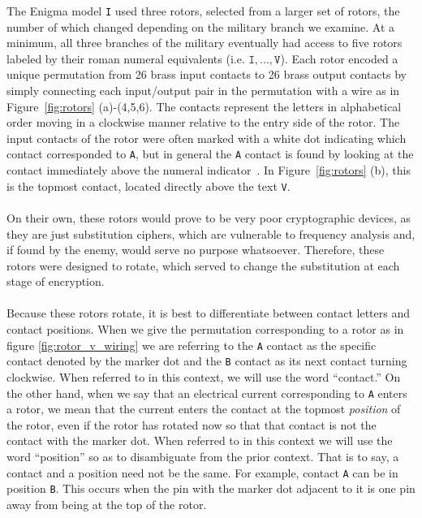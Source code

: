 The Enigma model \texttt{I} used three rotors, selected from a larger
set of rotors, the number of which changed depending on the military
branch we examine. At a minimum, all three branches of the military eventually
had access to five rotors labeled by their roman numeral equivalents
(i.e. $\texttt{I},\dots,\texttt{V}$).
Each rotor encoded a unique permutation from 26 brass input contacts to 26
brass output contacts by simply connecting each input/output pair
in the permutation with a wire as in Figure~\ref{fig:rotors}
(a)-(4,5,6). The contacts represent the letters
in alphabetical order moving in a clockwise manner relative to the
entry side of the rotor. The input contacts of the rotor were often marked
with a white dot indicating which contact corresponded to \texttt{A},
but in general the \texttt{A} contact is found by looking at the contact immediately above
the numeral indicator~\cite{cryptomuseumEnigmaWiring}. In Figure~\ref{fig:rotors} (b), this is the topmost contact, located directly above the text \texttt{V}. 
\\\\On their own, these rotors would prove to be very poor
cryptographic devices, as they are just substitution ciphers, which are
vulnerable to frequency analysis and, if found by the enemy, would
serve no purpose whatsoever. Therefore, these rotors were designed to
rotate, which served to change the substitution at each stage of encryption.
\\\\Because these rotors rotate, it is best to differentiate between
contact letters and contact positions. When we give the permutation
corresponding to a rotor as in figure \ref{fig:rotor_v_wiring} we are
referring to the \texttt{A} contact as the specific contact denoted
by the marker dot and the \texttt{B} contact as its next contact
turning clockwise. When referred to in this context, we will use the
word ``contact.'' On the other hand, when we say that an electrical
current corresponding to \texttt{A} enters a rotor, we mean
that the current enters the contact at the topmost \emph{position} of
the rotor, even if the rotor has rotated now so that that contact
is not the contact with the marker dot. When referred to in this
context we will use the word ``position'' so as to disambiguate from
the prior context. That is to say, a contact and a position need not
be the same. For example, contact \texttt{A} can be in position
\texttt{B}. This occurs when the pin with the marker dot adjacent to
it is one pin away from being at the top of the rotor.

